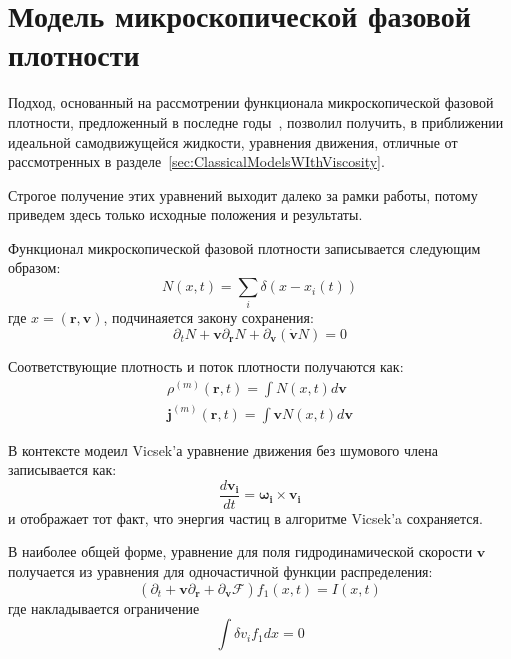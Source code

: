 \section{Модель микроскопической фазовой плотности} %
\label{sec:KulinskyModel}

	Подход, основанный на рассмотрении функционала микроскопической фазовой плотности, предложенный в последне годы~\cite{chepizhko2013,kulinskii2012}, позволил получить, в приближении идеальной самодвижущейся жидкости, уравнения движения, отличные от рассмотренных в разделе~\ref{sec:ClassicalModelsWIthViscosity}.

	Строгое получение этих уравнений выходит далеко за рамки работы, потому приведем здесь только исходные положения и результаты.

	Функционал микроскопической фазовой плотности записывается следующим образом:
	\begin{equation}
		N(x,t) = \sum_i \delta(x-x_i(t))
	\end{equation}
	где $x = (\boldsymbol{r}, \boldsymbol{v})$, подчинаяется закону сохранения:
	\begin{equation}
		\partial_t N  + \boldsymbol{v} \partial_{\boldsymbol{r}} N + \partial_{\boldsymbol{v}} (\boldsymbol{\dot{v}} N) = 0
	\end{equation}

	Соответствующие плотность и поток плотности получаются как:
	\begin{align}
		\rho^{(m)}(\boldsymbol{r},t) = \int N(x,t)d \boldsymbol{v}
		\\
		\boldsymbol{j}^{(m)}(\boldsymbol{r},t) = \int \boldsymbol{v} N(x,t)d \boldsymbol{v}
	\end{align}

	В контексте модеил Vicsek'а уравнение движения без шумового члена записывается как:
	\begin{equation}
		\frac{d \boldsymbol{v_i}}{dt} = \boldsymbol{\omega_i} \times \boldsymbol{v_i}
	\end{equation}
	и отображает тот факт, что энергия частиц в алгоритме Vicsek'a сохраняется.

	В наиболее общей форме, уравнение для поля гидродинамической скорости $\boldsymbol{v}$ получается из уравнения для одночастичной функции распределения:
	\begin{equation}
		(\partial_t + \boldsymbol{v} \partial_{\boldsymbol{r}}+\partial_{\boldsymbol{v}}\boldsymbol{\mathcal{F}}) f_1(x,t) = I(x,t)
	\end{equation}
	где накладывается ограничение
	\begin{equation}
		\int \delta v_i f_1 dx= 0
	\end{equation}

